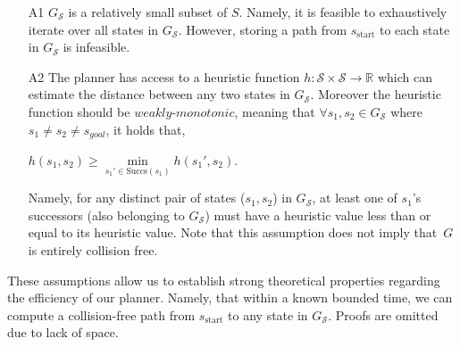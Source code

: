 \documentclass[letterpaper]{article} %
\newcommand{\calS}{\ensuremath{\mathcal{S}}\xspace}
\newcommand{\sStart}{\ensuremath{s_{\text{start}}\xspace}}
\begin{document}
\begin{enumerate}
  \item[A1] $G_\calS$ is a relatively small subset of $S$. Namely, it is feasible to exhaustively iterate over all states in $G_\calS$.
However, storing a path from $\sStart$ to each state in $G_\calS$ is infeasible.
  
  \item[A2] The planner has access to a heuristic function $h: \calS \times \calS \rightarrow \mathbb{R}$ which can estimate the distance between any two states in $G_\calS$. Moreover the heuristic function should be $\textit{weakly-monotonic}$, meaning that $\forall s_1, s_2  \in G_\calS$ where $s_1 \neq s_2 \neq s_{goal}$, it holds that,

  \begin{center}
    $h(s_1, s_2) \geq \min\limits_{s_1' \in \text{Succs}(s_1)} h(s_1', s_2)$. 
  \end{center}
  Namely, for any distinct pair of states ($s_1, s_2$) in $G_\calS$, at least one of $s_1$'s successors (also belonging to $G_\calS$) must have a heuristic value less than or equal to its heuristic value.
	Note that this assumption does not imply  that~$G$ is entirely collision free.
%	
%	
\end{enumerate}

These assumptions allow us to establish strong theoretical properties regarding the efficiency of our planner. Namely, that
within a known bounded time, we can compute a collision-free path from $\sStart$ to any state in $G_\calS$. Proofs are omitted due to lack of space. 
\end{document}

